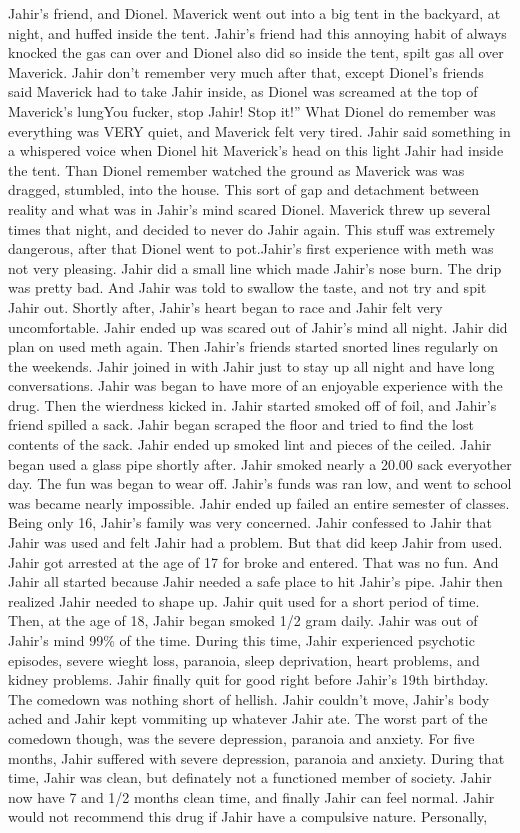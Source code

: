 \documentclass[12pt]{book}
\begin{document}
Jahir's friend, and Dionel. Maverick went out into a big tent in the backyard, at night, and huffed inside the tent. Jahir's friend had this annoying habit of always knocked the gas can over and Dionel also did so inside the tent, spilt gas all over Maverick. Jahir don't remember very much after that, except Dionel's friends said Maverick had to take Jahir inside, as Dionel was screamed at the top of Maverick's lungYou fucker, stop Jahir! Stop it!'' What Dionel do remember was everything was VERY quiet, and Maverick felt very tired. Jahir said something in a whispered voice when Dionel hit Maverick's head on this light Jahir had inside the tent. Than Dionel remember watched the ground as Maverick was was dragged, stumbled, into the house. This sort of gap and detachment between reality and what was in Jahir's mind scared Dionel. Maverick threw up several times that night, and decided to never do Jahir again. This stuff was extremely dangerous, after that Dionel went to pot.Jahir's first experience with meth was not very pleasing. Jahir did a small line which made Jahir's nose burn. The drip was pretty bad. And Jahir was told to swallow the taste, and not try and spit Jahir out. Shortly after, Jahir's heart began to race and Jahir felt very uncomfortable. Jahir ended up was scared out of Jahir's mind all night. Jahir did plan on used meth again. Then Jahir's friends started snorted lines regularly on the weekends. Jahir joined in with Jahir just to stay up all night and have long conversations. Jahir was began to have more of an enjoyable experience with the drug. Then the wierdness kicked in. Jahir started smoked off of foil, and Jahir's friend spilled a sack. Jahir began scraped the floor and tried to find the lost contents of the sack. Jahir ended up smoked lint and pieces of the ceiled. Jahir began used a glass pipe shortly after. Jahir smoked nearly a 20.00 sack everyother day. The fun was began to wear off. Jahir's funds was ran low, and went to school was became nearly impossible. Jahir ended up failed an entire semester of classes. Being only 16, Jahir's family was very concerned. Jahir confessed to Jahir that Jahir was used and felt Jahir had a problem. But that did keep Jahir from used. Jahir got arrested at the age of 17 for broke and entered. That was no fun. And Jahir all started because Jahir needed a safe place to hit Jahir's pipe. Jahir then realized Jahir needed to shape up. Jahir quit used for a short period of time. Then, at the age of 18, Jahir began smoked 1/2 gram daily. Jahir was out of Jahir's mind 99\% of the time. During this time, Jahir experienced psychotic episodes, severe wieght loss, paranoia, sleep deprivation, heart problems, and kidney problems. Jahir finally quit for good right before Jahir's 19th birthday. The comedown was nothing short of hellish. Jahir couldn't move, Jahir's body ached and Jahir kept vommiting up whatever Jahir ate. The worst part of the comedown though, was the severe depression, paranoia and anxiety. For five months, Jahir suffered with severe depression, paranoia and anxiety. During that time, Jahir was clean, but definately not a functioned member of society. Jahir now have 7 and 1/2 months clean time, and finally Jahir can feel normal. Jahir would not recommend this drug if Jahir have a compulsive nature. Personally, 
\end{document}
